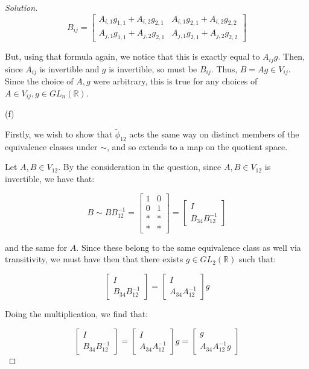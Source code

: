 \documentclass[10pt]{article}
\begin{document}
\begin{proof}[Solution]
$$ B_{ij} = \begin{bmatrix}A_{i,1}g_{1,1} + A_{i,2}g_{2,1} & A_{i,1}g_{2,1} + A_{i,2}g_{2,2} \\  A_{j,1}g_{1,1} + A_{j,2}g_{2,1} & A_{j,1}g_{2,1} + A_{j,2}g_{2,2} \end{bmatrix} $$

But, using that formula again, we notice that this is exactly equal to $A_{ij} g$. Then, since $A_{ij}$ is invertible and $g$ is invertible, so must be $B_{ij}$. Thus, $B = Ag \in V_{ij}$. Since the choice of $A, g$ were arbitrary, this is true for any choices of $A \in V_{ij}, g \in GL_n(\mathbb{R})$.

(f)

Firstly, we wish to show that $\tilde{\phi}_{12}$ acts the same way on distinct members of the equivalence classes under $\sim$, and so extends to a map on the quotient space.

Let $A, B \in V_{12}$. By the consideration in the question, since $A, B \in V_{12}$ is invertible, we have that:

$$ B \sim BB^{-1}_{12} = \begin{bmatrix} 1 & 0 \\ 0 & 1 \\ * &* \\ *&*\end{bmatrix} = \begin{bmatrix} I \\ B_{34}B^{-1}_{12} \end{bmatrix} $$

and the same for $A$. Since these belong to the same equivalence class as well via transitivity, we must have then that there exists $g \in GL_2(\mathbb{R})$ such that:

$$  \begin{bmatrix} I \\ B_{34}B^{-1}_{12} \end{bmatrix} =  \begin{bmatrix} I \\ A _{34}A^{-1}_{12} \end{bmatrix} g $$

Doing the multiplication, we find that:

$$  \begin{bmatrix} I \\ B_{34}B^{-1}_{12} \end{bmatrix} =  \begin{bmatrix} I \\ A _{34}A^{-1}_{12} \end{bmatrix} g  = \begin{bmatrix} g \\ A _{34}A^{-1}_{12}g \end{bmatrix}$$


\end{proof}
\end{document}
